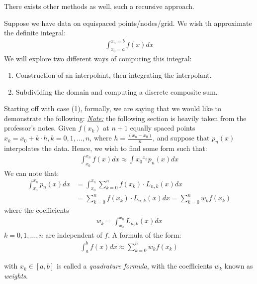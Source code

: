 \documentclass{article}
\begin{document}
There exists other methods as well, such a recursive approach.
\pagebreak


 Suppose we have data on equispaced points/nodes/grid. We wish th approximate the definite integral:
\begin{align*}
  \int_{x_0=a}^{x_n=b} f(x)dx
\end{align*}
We will explore two different ways of computing this integral:
\begin{enumerate}
\item Construction of an interpolant, then integrating the interpolant.
\item Subdividing the domain and computing a discrete composite sum.
\end{enumerate}

Starting off with case (1), formally, we are saying that we would like to demonstrate the following:
\gap
\underline{\textit{Note:}} the following section is heavily taken from the professor's notes.
\gap
Given $f(x_k)$ at $n+1$ equally spaced points $x_k = x_0 + k \cdot h, k = 0, 1, \ldots, n$, where $h = \frac{(x_n - x_0)}{n}$, and suppose that $p_n(x)$ interpolates the data. Hence, we wish to find some form such that:
\begin{align*}
  \int_{x_0}^{x_n}f(x)dx \approx \int{x_0}^{x_n}p_n(x)dx
\end{align*}
We can note that:
\begin{align*}
  \int_{x_0}^{x_n}p_n(x)dx &= \int_{x_0}^{x_n}\sum_{k=0}^{n}f(x_k)\cdot L_{n,k}(x)dx\\
                           &= \sum_{k=0}^{n}f(x_k)\cdot L_{n, k}(x)dx = \sum_{k=0}^{n}w_kf(x_k)
\end{align*}
where the coefficients
\begin{align*}
  w_k = \int_{x_0}^{x_n}L_{n,k}(x)dx
\end{align*}
$k= 0,1,\ldots,n$ are independent of $f$.
\gap
A formula of the form:
\begin{align*}
  \int_{a}^{b}f(x)dx \approx \sum_{k=0}^{n}w_k f(x_k)
\end{align*}

with $x_k \in [a, b]$ is called a \textit{quadrature formula}, with the coefficients $w_k$ known as \textit{weights}.
\end{document}
